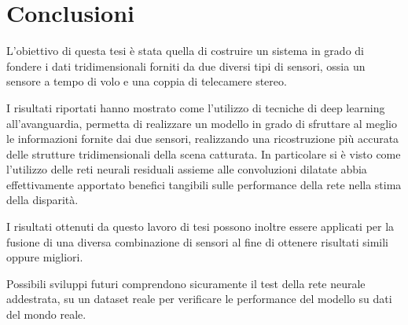 \chapter{Conclusioni}
L'obiettivo di questa tesi è stata quella di costruire un sistema in grado di fondere i dati tridimensionali forniti da due diversi tipi di sensori, ossia un sensore a tempo di volo e una coppia di telecamere stereo.\par
I risultati riportati hanno mostrato come l'utilizzo di tecniche di deep learning all'avanguardia, permetta di realizzare un modello in grado di sfruttare al meglio le informazioni fornite dai due sensori, realizzando una ricostruzione più accurata delle strutture tridimensionali della scena catturata. In particolare si è visto come l'utilizzo delle reti neurali residuali assieme alle convoluzioni dilatate abbia effettivamente apportato benefici tangibili sulle performance della rete nella stima della disparità.\par
I risultati ottenuti da questo lavoro di tesi possono inoltre essere applicati per la fusione di una diversa combinazione di sensori al fine di ottenere risultati simili oppure migliori.\par
Possibili sviluppi futuri comprendono sicuramente il test della rete neurale addestrata, su un dataset reale per verificare le performance del modello su dati del mondo reale.